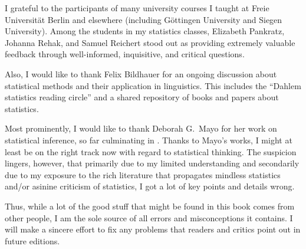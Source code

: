 
I grateful to the participants of many university courses I taught at Freie Universität Berlin and elsewhere (including Göttingen University and Siegen University).
Among the students in my statistics classes, Elizabeth Pankratz, Johanna Rehak, and Samuel Reichert stood out as providing extremely valuable feedback through well-informed, inquisitive, and critical questions.

Also, I would like to thank Felix Bildhauer for an ongoing discussion about statistical methods and their application in linguistics.
This includes the ``Dahlem statistics reading circle'' and a shared repository of books and papers about statistics.

Most prominently, I would like to thank Deborah G.\ Mayo for her work on statistical inference, so far culminating in \citet{Mayo2018}.
Thanks to Mayo's works, I might at least be on the right track now with regard to statistical thinking.
The suspicion lingers, however, that primarily due to my limited understanding and secondarily due to my exposure to the rich literature that propagates mindless statistics and\slash or asinine criticism of statistics, I got a lot of key points and details wrong.

Thus, while a lot of the good stuff that might be found in this book comes from other people, I am the sole source of all errors and misconceptions it contains.
I will make a sincere effort to fix any problems that readers and critics point out in future editions.
